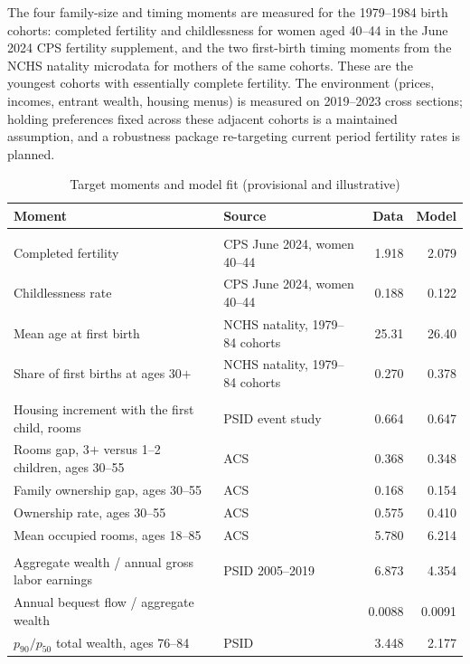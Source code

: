 \documentclass[11pt]{article}
\begin{document}
The four family-size and timing moments are measured for the 1979--1984 birth
cohorts: completed fertility and childlessness for women aged 40--44 in the
June 2024 CPS fertility supplement, and the two first-birth timing moments
from the NCHS natality microdata for mothers of the same cohorts. These are
the youngest cohorts with essentially complete fertility. The environment (prices, incomes, entrant wealth, housing menus)
is measured on 2019--2023 cross sections; holding preferences fixed across
these adjacent cohorts is a maintained assumption, and a robustness package
re-targeting current period fertility rates is planned.

\begin{table}[H]
\centering
\caption{Target moments and model fit (provisional and illustrative)}
\label{tab:quant_fit}
\small
\begin{tabularx}{0.99\textwidth}{@{}>{\raggedright\arraybackslash}X l r r@{}}
\toprule
Moment & Source & Data & Model \\
\midrule
\multicolumn{4}{@{}l}{\emph{Family size and timing}} \\
Completed fertility & CPS June 2024, women 40--44 & 1.918 & 2.079 \\
Childlessness rate & CPS June 2024, women 40--44 & 0.188 & 0.122 \\
Mean age at first birth & NCHS natality, 1979--84 cohorts & 25.31 & 26.40 \\
Share of first births at ages 30$+$ & NCHS natality, 1979--84 cohorts & 0.270 & 0.378 \\
\addlinespace
\multicolumn{4}{@{}l}{\emph{Family housing and tenure}} \\
Housing increment with the first child, rooms & PSID event study & 0.664 & 0.647 \\
Rooms gap, 3$+$ versus 1--2 children, ages 30--55 & ACS & 0.368 & 0.348 \\
Family ownership gap, ages 30--55 & ACS & 0.168 & 0.154 \\
Ownership rate, ages 30--55 & ACS & 0.575 & 0.410 \\
Mean occupied rooms, ages 18--85 & ACS & 5.780 & 6.214 \\
\addlinespace
\multicolumn{4}{@{}l}{\emph{Wealth and bequests}} \\
Aggregate wealth / annual gross labor earnings & PSID 2005--2019 & 6.873 & 4.354 \\
Annual bequest flow / aggregate wealth & \citet{denardiYang2014} & 0.0088 & 0.0091 \\
$p_{90}/p_{50}$ total wealth, ages 76--84 & PSID & 3.448 & 2.177 \\
\bottomrule
\end{tabularx}
\end{table}
\end{document}
